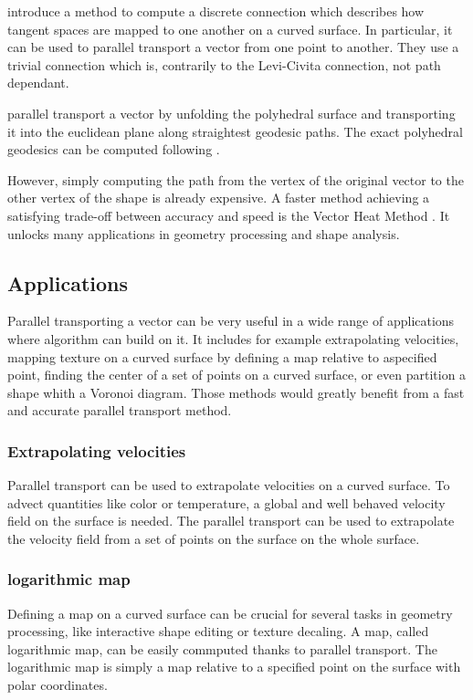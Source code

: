 \documentclass[sigconf]{acmart}
\begin{document}
\cite{crane_trivial_2010} introduce a method to compute a discrete connection which describes how tangent spaces are mapped to one another on a curved surface. In particular, it can be used to parallel transport a vector from one point to another. They use a trivial connection which is, contrarily to the Levi-Civita connection, not path dependant.

\cite{polthier_straightest_2006} parallel transport a vector by unfolding the polyhedral surface and transporting it into the euclidean plane along straightest geodesic paths. The exact polyhedral geodesics can be computed following \cite{surazhsky_fast_nodate}.

However, simply computing the path from the vertex of the original vector to the other vertex of the shape is already expensive. A faster method achieving a satisfying trade-off between accuracy and speed is the Vector Heat Method \cite{Sharp:2019:VHM}. It unlocks many applications in geometry processing and shape analysis.


\subsection{Applications}
Parallel transporting a vector can be very useful in a wide range of applications where algorithm can build on it. It includes for example extrapolating velocities, mapping texture on a curved surface by defining a map relative to aspecified point, finding the center of a set of points on a curved surface, or even partition a shape whith a Voronoi diagram. Those methods would greatly benefit from a fast and accurate parallel transport method.

\subsubsection{Extrapolating velocities}
Parallel transport can be used to extrapolate velocities on a curved surface. To advect quantities like color or temperature, a global and well behaved velocity field on the surface is needed. The parallel transport can be used to extrapolate the velocity field from a set of points on the surface on the whole surface.

\subsubsection{logarithmic map}
Defining a map on a curved surface can be crucial for several tasks in geometry processing, like interactive shape editing or texture decaling. A map, called logarithmic map, can be easily commputed thanks to parallel transport. The logarithmic map is simply a map relative to a specified point on the surface with polar coordinates. 
\end{document}
